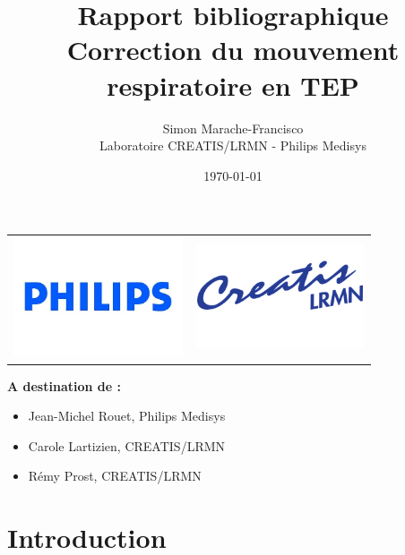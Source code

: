 \documentclass[12pt]{book}
\title{\Huge{Rapport bibliographique}\\\Large{Correction du mouvement respiratoire en TEP}}
\author{
        \vspace{2cm}
        Simon Marache-Francisco \\
        Laboratoire CREATIS/LRMN - Philips Medisys\\
        \vspace{2cm}
}
\date{\today}
\begin{document}
\addtolength{\parskip}{0.5em}

\renewcommand{\cftsecaftersnumb}{\hspace{1em}}
\renewcommand{\cftsubsecaftersnumb}{\hspace{1em}}
\renewcommand{\cftsubsubsecaftersnumb}{\hspace{1em}}


\newcommand{\verrous}{\textbf{Verrous levés}}

\newcommand{\todo}[1]{
\addcontentsline{toc}{subsection}{\textbf{Todo:} #1}
$\|$\textbf{A Faire : }#1$\|$
}


\maketitle
\thispagestyle{empty}

\begin{center}
	\begin{tabular}{c c}
		\includegraphics[width=5cm]{images/logoPhilips} & \includegraphics[width=5cm]{images/logoCREATIS}
	\end{tabular}
\end{center}


\vfill

\textbf{A destination de :}
\begin{itemize}
    \item Jean-Michel Rouet, Philips Medisys
    \item Carole Lartizien, CREATIS/LRMN
    \item Rémy Prost, CREATIS/LRMN
\end{itemize}
\newpage

\tableofcontents


\part{Introduction}
\end{document}
